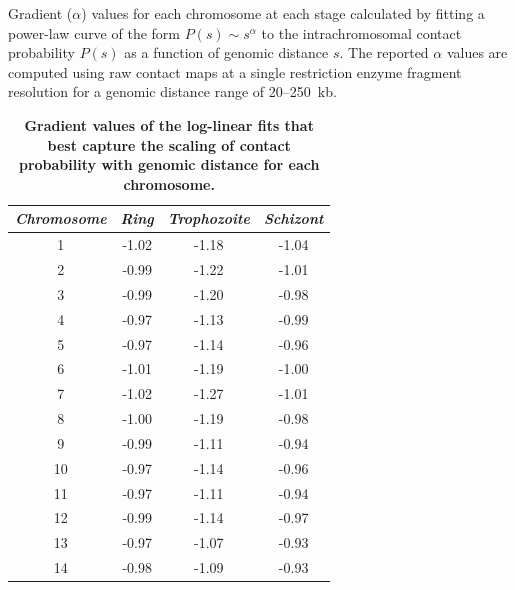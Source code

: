 \begin{table}
\caption{{\bf Gradient values of the log-linear fits that best capture the scaling of
    contact probability with genomic distance for each chromosome.}}
{ Gradient ($\alpha$) values for each chromosome at each stage calculated by fitting
    a power-law curve of the form $P(s) \sim s^\alpha$ to the intrachromosomal contact
    probability $P(s)$ as a function of genomic distance $s$. The reported $\alpha$
    values are computed using raw contact maps at a single restriction enzyme fragment
    resolution for a genomic distance range of 20--250~kb.
}
\vspace{10pt}
\begin{center}
\begin{tabular}{cccc}
\hline
\emph{Chromosome} & \emph{Ring} & \emph{Trophozoite} & \emph{Schizont} \\
\hline
1 & -1.02 & -1.18 & -1.04 \\
2 & -0.99 & -1.22 & -1.01 \\
3 & -0.99 & -1.20 & -0.98 \\
4 & -0.97 & -1.13 & -0.99 \\
5 & -0.97 & -1.14 & -0.96 \\
6 & -1.01 & -1.19 & -1.00 \\
7 & -1.02 & -1.27 & -1.01 \\
8 & -1.00 & -1.19 & -0.98 \\
9 & -0.99 & -1.11 & -0.94 \\
10 & -0.97 & -1.14 & -0.96 \\
11 & -0.97 & -1.11 & -0.94 \\
12 & -0.99 & -1.14 & -0.97 \\
13 & -0.97 & -1.07 & -0.93 \\
14 & -0.98 & -1.09 & -0.93 \\
\hline
\end{tabular}
\end{center}
\label{table:scalingFactors}
\end{table}
\clearpage

